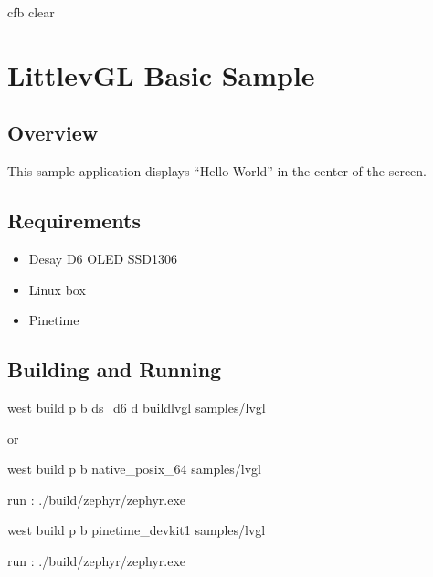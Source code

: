 \documentclass[letterpaper,10pt,english]{sphinxmanual}
\begin{document}
\begin{sphinxVerbatim}[commandchars=\\\{\}]
 cfb clear
\end{sphinxVerbatim}


\section{LittlevGL Basic Sample}
\label{\detokenize{samples/sampleslvglREADME:littlevgl-basic-sample}}\label{\detokenize{samples/sampleslvglREADME:lvgl-sample}}\label{\detokenize{samples/sampleslvglREADME::doc}}

\subsection{Overview}
\label{\detokenize{samples/sampleslvglREADME:overview}}
This sample application displays “Hello World” in the center of the screen.


\subsection{Requirements}
\label{\detokenize{samples/sampleslvglREADME:requirements}}\begin{itemize}
\item {} 
Desay D6 OLED SSD1306

\item {} 
Linux box

\item {} 
Pinetime

\end{itemize}


\subsection{Building and Running}
\label{\detokenize{samples/sampleslvglREADME:building-and-running}}
west build \sphinxhyphen{}p \sphinxhyphen{}b ds\_d6 \sphinxhyphen{}d build\sphinxhyphen{}lvgl samples/lvgl

or

west build \sphinxhyphen{}p \sphinxhyphen{}b native\_posix\_64 samples/lvgl

run : ./build/zephyr/zephyr.exe

west build \sphinxhyphen{}p \sphinxhyphen{}b pinetime\_devkit1 samples/lvgl

run : ./build/zephyr/zephyr.exe
\end{document}
